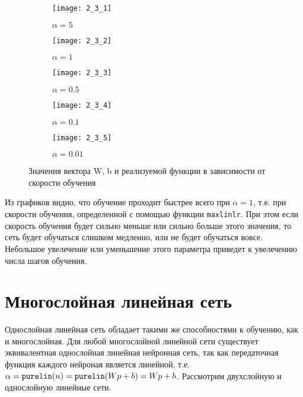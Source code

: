\begin{figure}[H]
\begin{center}
	\begin{subfigure}[b]{0.49\textwidth}
		\texttt{[image: 2\_3\_1]}
		\caption{$\alpha = 5$}
	\end{subfigure}
	\begin{subfigure}[b]{0.49\textwidth}
		\texttt{[image: 2\_3\_2]}
		\caption{$\alpha = 1$}
	\end{subfigure}
	\begin{subfigure}[b]{0.49\textwidth}
		\texttt{[image: 2\_3\_3]}
		\caption{$\alpha = 0.5$}
	\end{subfigure}
	\begin{subfigure}[b]{0.49\textwidth}
		\texttt{[image: 2\_3\_4]}
		\caption{$\alpha = 0.1$}
	\end{subfigure}
	\begin{subfigure}[b]{0.49\textwidth}
		\texttt{[image: 2\_3\_5]}
		\caption{$\alpha = 0.01$}
	\end{subfigure}
	\caption{Значения вектора W, b и реализуемой функции в зависимости от скорости обучения}
	\label{fig:2_3}
\end{center}
\end{figure}

Из графиков видно, что обучение проходит быстрее всего при $\alpha = 1$, т.е. при скорости обучения, определенной с помощью функции \verb+maxlinlr+. При этом если скорость обучения будет сильно меньше или сильно больше этого значения, то сеть будет обучаться слишком медленно, или не будет обучаться вовсе. Небольшое увелечение или уменьшение этого параметра приведет к увелечению числа шагов обучения.

\section{Многослойная линейная сеть}


Однослойная линейная сеть обладает такими же способностями к обучению, как и многослойная. Для любой многослойной линейной сети существует эквивалентная однослойная линейная нейронная сеть, так как передаточная функция каждого нейроная является линейной, т.е. $\alpha = \verb+purelin+(n) = \verb+purelin+(Wp+b) = Wp+b$. Рассмотрим двухслойную и однослойную линейные сети.

